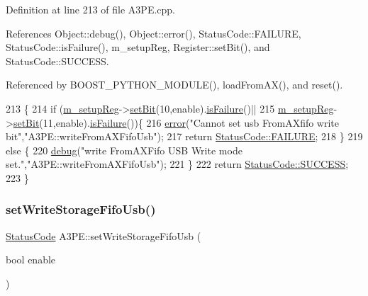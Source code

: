 Definition at line 213 of file A3\+P\+E.\+cpp.



References Object\+::debug(), Object\+::error(), Status\+Code\+::\+F\+A\+I\+L\+U\+RE, Status\+Code\+::is\+Failure(), m\+\_\+setup\+Reg, Register\+::set\+Bit(), and Status\+Code\+::\+S\+U\+C\+C\+E\+SS.



Referenced by B\+O\+O\+S\+T\+\_\+\+P\+Y\+T\+H\+O\+N\+\_\+\+M\+O\+D\+U\+L\+E(), load\+From\+A\+X(), and reset().


\begin{DoxyCode}
213                                                 \{
214   \textcolor{keywordflow}{if} (\hyperlink{classA3PE_a142fa10b7e705c4701ae21678ec2ec8a}{m\_setupReg}->\hyperlink{classRegister_ab094246dd12aa7e0aa0ca917f4e70b31}{setBit}(10,enable).\hyperlink{classStatusCode_a5dd22dc6eb2c52fc4cabc58f6dea2eb7}{isFailure}()||
215       \hyperlink{classA3PE_a142fa10b7e705c4701ae21678ec2ec8a}{m\_setupReg}->\hyperlink{classRegister_ab094246dd12aa7e0aa0ca917f4e70b31}{setBit}(11,enable).\hyperlink{classStatusCode_a5dd22dc6eb2c52fc4cabc58f6dea2eb7}{isFailure}())\{
216     \hyperlink{classObject_a204a95f57818c0f811933917a30eff45}{error}(\textcolor{stringliteral}{"Cannot set usb FromAXfifo write bit"},\textcolor{stringliteral}{"A3PE::writeFromAXFifoUsb"});
217     \textcolor{keywordflow}{return} \hyperlink{classStatusCode_a6f565cbeadc76d14c72f047e5e85eb4ba3da73d4c469762eb9d3c960368252b26}{StatusCode::FAILURE};
218   \}
219   \textcolor{keywordflow}{else} \{
220     \hyperlink{classObject_aac010553f022165573714b7014a15f0d}{debug}(\textcolor{stringliteral}{"write FromAXFifo USB Write mode set."},\textcolor{stringliteral}{"A3PE::writeFromAXFifoUsb"});
221   \}
222   \textcolor{keywordflow}{return} \hyperlink{classStatusCode_a6f565cbeadc76d14c72f047e5e85eb4badd0da38d3ba0d922efd1f4619bc37ad8}{StatusCode::SUCCESS};
223 \}
\end{DoxyCode}
\mbox{\label{classA3PE_aa688f9dff8d2892464fcd13fdf3600ad}} 
\subsubsection{\texorpdfstring{set\+Write\+Storage\+Fifo\+Usb()}{setWriteStorageFifoUsb()}}
{\footnotesize\ttfamily \hyperlink{classStatusCode}{Status\+Code} A3\+P\+E\+::set\+Write\+Storage\+Fifo\+Usb (\begin{DoxyParamCaption}\item[{bool}]{enable }\end{DoxyParamCaption})}



